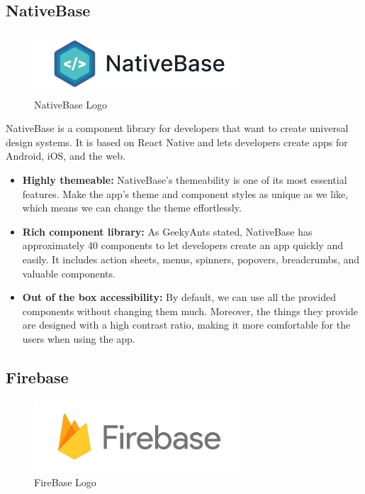 \subsection{NativeBase}

\begin{figure}[H]
	\centering
	\includegraphics[width=0.7\textwidth]{img/technology/nativebase-logo.png}
	\caption{NativeBase Logo}
	\label{fig:NativeBaseLogo}
\end{figure}

NativeBase\cite{NativeBase} is a component library for developers that want to create universal design systems. It is based on React Native and lets developers create apps for Android, iOS, and the web.

\begin{itemize}
	\item \textbf{Highly themeable:} NativeBase's themeability is one of its most essential features. Make the app's theme and component styles as unique as we like, which means we can change the theme effortlessly.
 \item \textbf{Rich component library:} As GeekyAnts stated, NativeBase has approximately 40 components to let developers create an app quickly and easily. It includes action sheets, menus, spinners, popovers, breadcrumbs, and valuable components.
 \item \textbf{Out of the box accessibility:} By default, we can use all the provided components without changing them much. Moreover, the things they provide are designed with a high contrast ratio, making it more comfortable for the users when using the app.
\end{itemize}

\subsection{Firebase}

\begin{figure}[H]
	\centering
	\includegraphics[width=0.7\textwidth]{img/technology/firebase.png}
	\caption{FireBase Logo}
	\label{fig:FireBaseLogo}
\end{figure}

